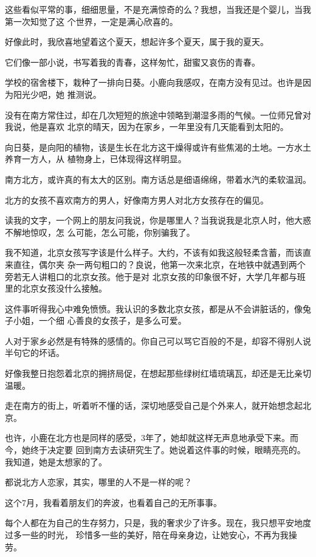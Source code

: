 		这些看似平常的事，细细思量，不是充满惊奇的么？我想，当我还是个婴儿，当我第一次知觉了这
	个世界，一定是满心欣喜的。

		好像此时，我欣喜地望着这个夏天，想起许多个夏天，属于我的夏天。

		它们像一部小说，书写着我的青春，这样匆忙，甜蜜又哀伤的青春。

		学校的宿舍楼下，栽种了一排向日葵。小鹿向我感叹，在南方没有见过。也许是因为阳光少吧，她
	推测说。

		没有在南方常住过，却在几次短短的旅途中领略到潮湿多雨的气候。一位师兄曾对我说，他是喜欢
	北京的晴天，因为在家乡，一年里没有几天能看到太阳的。

		向日葵，是向阳的植物，该是生长在北方这干燥得或许有些焦渴的土地。一方水土养育一方人，从
	植物身上，已体现得这样明显。

		南方北方，或许真的有太大的区别。南方话总是细语绵绵，带着水汽的柔软温润。

		北方的女孩不喜欢南方的男人，好像南方男人对北方女孩存在的偏见。

		读我的文字，一个网上的朋友问我说，你是哪里人？当我说我是北京人时，他大惑不解地惊叹，怎
	么可能，怎么可能，你别骗我了。

		我不知道，北京女孩写字该是什么样子。大约，不该有如我这般轻柔含蓄，而该直来直往，偶尔夹
	杂一两句粗口的？良说，他第一次来北京，在地铁中就遇到两个旁若无人讲粗口的北京女孩。他于是对
	北京女孩的印象很不好，大学几年都与班里的北京女孩没什么接触。

		这件事听得我心中难免愤愤。我认识的多数北京女孩，都是从不会讲脏话的，像兔子小姐，一个细
	心善良的女孩子，是多么可爱。

		人对于家乡必然是有特殊的感情的。你自己可以骂它百般的不是，却容不得别人说半句它的坏话。

		好像我整日抱怨着北京的拥挤局促，在想起那些绿树红墙琉璃瓦，却还是无比亲切温暖。

		走在南方的街上，听着听不懂的话，深切地感受自己是个外来人，就开始想念起北京。

		也许，小鹿在北方也是同样的感受，3年了，她却就这样无声息地承受下来。而今，她终于决定要
	回到南方去读研究生了。她说着这件事的时候，眼睛亮亮的。我知道，她是太想家的了。

		都说北方人恋家，其实，哪里的人不是一样的呢？

		这个7月，我看着朋友们的奔波，也看着自己的无所事事。

		每个人都在为自己的生存努力，只是，我的奢求少了许多。现在，我只想平安地度过多一些的时光，
	珍惜多一些的美好，陪在母亲身边，让她安心，不再为我操劳。

